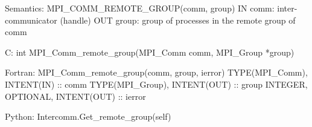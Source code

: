 Semantics:
MPI_COMM_REMOTE_GROUP(comm, group)
IN comm: inter-communicator (handle)
OUT group: group of processes in the remote group of comm

C:
int MPI_Comm_remote_group(MPI_Comm comm, MPI_Group *group)

Fortran:
MPI_Comm_remote_group(comm, group, ierror)
TYPE(MPI_Comm), INTENT(IN) ::  comm
TYPE(MPI_Group), INTENT(OUT) ::  group
INTEGER, OPTIONAL, INTENT(OUT) ::  ierror

Python:
Intercomm.Get_remote_group(self)
